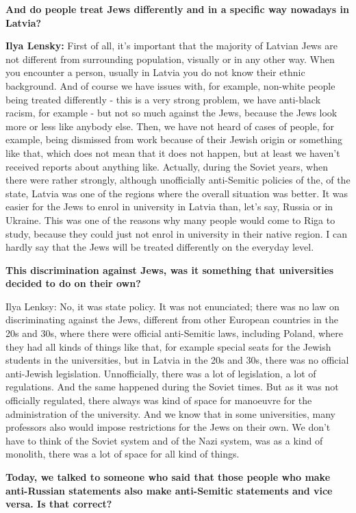 \textbf{And do people treat Jews differently and in a specific way nowadays in Latvia?} 

\textbf{Ilya Lensky:} First of all, it's important that the majority of Latvian Jews are not different from surrounding population, visually or in any other way. When you encounter a person, usually in Latvia you do not know their ethnic background. And of course we have issues with, for example, non-white people being treated differently - this is a very strong problem, we have anti-black racism, for example - but not so much against the Jews, because the Jews look more or less like anybody else. Then, we have not heard of cases of people, for example, being dismissed from work because of their Jewish origin or something like that, which does not mean that it does not happen, but at least we haven't received reports about anything like. Actually, during the Soviet years, when there were rather strongly, although unofficially anti-Semitic policies of the, of the state, Latvia was one of the regions where the overall situation was better. It was easier for the Jews to enrol in university in Latvia than, let’s say, Russia or in Ukraine. This was one of the reasons why many people would come to Riga to study, because they could just not enrol in university in their native region. I can hardly say that the Jews will be treated differently on the everyday level. 

\textbf{This discrimination against Jews, was it something that universities decided to do on their own?} 

Ilya Lenksy: No, it was state policy. 
It was not enunciated; there was no law on discriminating against the Jews, different from other European countries in the 20s and 30s, where there were official anti-Semitic laws, including Poland, where they had all kinds of things like that, for example special seats for the Jewish students in the universities, but in Latvia in the 20s and 30s, there was no official anti-Jewish legislation. Unnofficially, there was a lot of legislation, a lot of regulations. And the same happened during the Soviet times. But as it was not officially regulated, there always was kind of space for manoeuvre for the administration of the university. And we know that in some universities, many professors also would impose restrictions for the Jews on their own. We don’t have to think of the Soviet system and of the Nazi system, was as a kind of monolith, there was a lot of space for all kind of things. 

\textbf{Today, we talked to someone who said that those people who make anti-Russian statements also make anti-Semitic statements and vice versa. Is that correct?}

